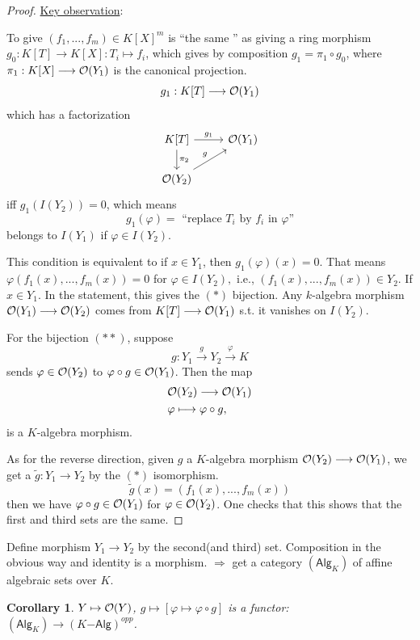 \documentclass[11pt]{article}
\newtheorem{cor}[thm]{Corollary}
\newcommand{\calo}{{\cal O}}
\newcommand{\Lrta}{\Longrightarrow}
\newcommand{\lrta}{\longrightarrow}
\begin{document}
\begin{proof}
\underline{Key observation}:

To give $(f_1,...,f_m)\in K[X]^m$ is ``the same '' as giving a ring morphism $g_0:K[T]\lrta K[X]: T_i\mapsto f_i$, which gives by composition $g_1=\pi_1\circ g_0$, where $\pi_1: K[X]\lrta \calo(Y_1)$ is the canonical projection.
$$
g_1: K[T]\lrta \calo(Y_1)
$$
which has a factorization
\[
\begin{tikzcd}
K[T] \arrow[r,"g_1"] \arrow[d,"\pi_2"]  & \calo(Y_1)  \\
   \calo(Y_2) \arrow[ur,"g"] & 
\end{tikzcd}
\]
iff $g_1(I(Y_2))=0$, which means 
$$
g_1(\varphi)=\text{ ``replace $T_i$ by $f_i$ in $\varphi$''}
$$
belongs to $I(Y_1)$ if $\varphi\in I(Y_2)$.

This condition is equivalent to if $x\in Y_1$, then $g_1(\varphi)(x)=0$. That means $\varphi(f_1(x),...,f_m(x))=0$ for $\varphi\in I(Y_2),$ i.e., $(f_1(x),...,f_m(x))\in Y_2$. If $x\in Y_1$. In the statement, this gives the $(*)$ bijection. Any $k$-algebra morphism $\calo(Y_1)\lrta\calo(Y_2)$  comes from $K[T]\lrta \calo(Y_1)$ s.t. it vanishes on $I(Y_2)$.


For the bijection $(**)$, suppose 
$$
g:Y_1\overset{g}{\lrta} Y_2\overset{\varphi}{\lrta} K
$$
sends $\varphi\in \calo(Y_2)$ to $\varphi\circ g\in\calo(Y_1)$. Then the map 
$$
\begin{aligned}
& \calo(Y_2)\lrta \calo(Y_1)\\
&\varphi\longmapsto \varphi\circ g,
\end{aligned}
$$
is a $K$-algebra morphism.

As for the reverse direction, given $g$ a $K$-algebra morphism $\calo(Y_2)\lrta \calo(Y_1)$, we get a $\tilde{g}:Y_1\lrta Y_2$ by the $(*)$ isomorphism.
$$
\tilde{g}(x)=(f_1(x),...,f_m(x))
$$
then we have $\varphi\circ g\in\calo(Y_1)$ for $\varphi\in \calo(Y_2)$. One checks that this shows that the first and third sets are the same.
\end{proof}

Define morphism $Y_1\lrta Y_2$ by the second(and third) set.  Composition in the obvious way and identity is a morphism.
$\Lrta$ get a category $(\mathsf{Alg}_K)$ of affine algebraic sets over $K$.

\begin{cor}
$Y\mapsto \calo(Y)$, $g\mapsto [\varphi\mapsto \varphi\circ g]$ is a functor: $(\mathsf{Alg}_K)\lrta (K\mathsf{-Alg})^{opp}$.
\end{cor}
\end{document}
